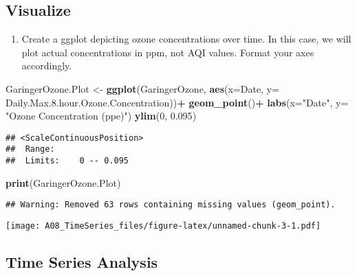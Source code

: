 \documentclass[]{article}
\newenvironment{Shaded}{\begin{snugshade}}{\end{snugshade}}
\newcommand{\DataTypeTok}[1]{\textcolor[rgb]{0.13,0.29,0.53}{#1}}
\newcommand{\DecValTok}[1]{\textcolor[rgb]{0.00,0.00,0.81}{#1}}
\newcommand{\FloatTok}[1]{\textcolor[rgb]{0.00,0.00,0.81}{#1}}
\newcommand{\KeywordTok}[1]{\textcolor[rgb]{0.13,0.29,0.53}{\textbf{#1}}}
\newcommand{\NormalTok}[1]{#1}
\newcommand{\OperatorTok}[1]{\textcolor[rgb]{0.81,0.36,0.00}{\textbf{#1}}}
\newcommand{\StringTok}[1]{\textcolor[rgb]{0.31,0.60,0.02}{#1}}
\providecommand{\tightlist}{%
  \setlength{\itemsep}{0pt}\setlength{\parskip}{0pt}}
\begin{document}
\hypertarget{visualize}{%
\subsection{Visualize}\label{visualize}}

\begin{enumerate}
\def\labelenumi{\arabic{enumi}.}
\setcounter{enumi}{6}
\tightlist
\item
  Create a ggplot depicting ozone concentrations over time. In this
  case, we will plot actual concentrations in ppm, not AQI values.
  Format your axes accordingly.
\end{enumerate}

\begin{Shaded}
\begin{Highlighting}[]
\NormalTok{GaringerOzone.Plot <-}\StringTok{ }
\StringTok{  }\KeywordTok{ggplot}\NormalTok{(GaringerOzone, }\KeywordTok{aes}\NormalTok{(}\DataTypeTok{x=}\NormalTok{Date, }\DataTypeTok{y=}\NormalTok{ Daily.Max.}\FloatTok{8.}\NormalTok{hour.Ozone.Concentration))}\OperatorTok{+}
\StringTok{  }\KeywordTok{geom_point}\NormalTok{()}\OperatorTok{+}
\StringTok{  }\KeywordTok{labs}\NormalTok{(}\DataTypeTok{x=}\StringTok{"Date"}\NormalTok{, }\DataTypeTok{y=} \StringTok{"Ozone Concentration (ppe)"}\NormalTok{)}
  \KeywordTok{ylim}\NormalTok{(}\DecValTok{0}\NormalTok{, }\FloatTok{0.095}\NormalTok{)}
\end{Highlighting}
\end{Shaded}

\begin{verbatim}
## <ScaleContinuousPosition>
##  Range:  
##  Limits:    0 -- 0.095
\end{verbatim}

\begin{Shaded}
\begin{Highlighting}[]
\KeywordTok{print}\NormalTok{(GaringerOzone.Plot)}
\end{Highlighting}
\end{Shaded}

\begin{verbatim}
## Warning: Removed 63 rows containing missing values (geom_point).
\end{verbatim}

\texttt{[image: A08\_TimeSeries\_files/figure-latex/unnamed-chunk-3-1.pdf]}

\hypertarget{time-series-analysis}{%
\subsection{Time Series Analysis}\label{time-series-analysis}}
\end{document}
